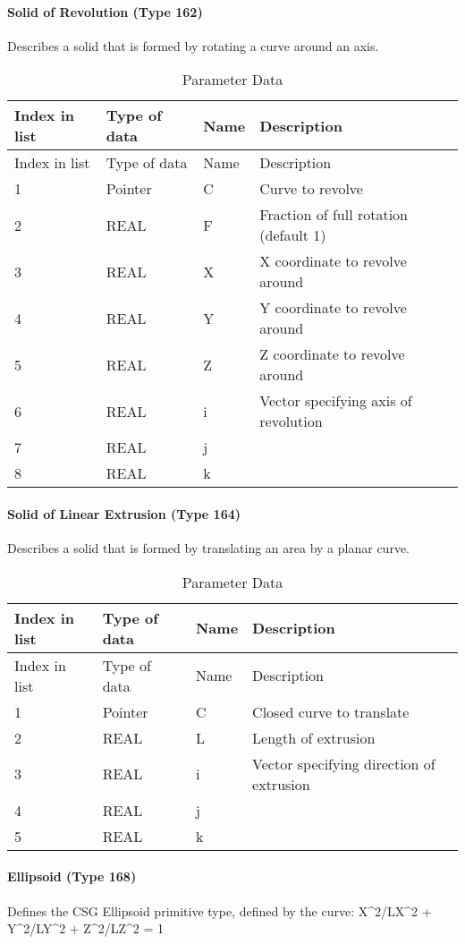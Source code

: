 \paragraph{Solid of Revolution (Type
162)}\label{solid-of-revolution-type-162}

Describes a solid that is formed by rotating a curve around an axis.

\begin{longtable}[c]{@{}llll@{}}
\caption{Parameter Data}\tabularnewline
\toprule
Index in list & Type of data & Name & Description\tabularnewline
\midrule
\endfirsthead
\toprule
Index in list & Type of data & Name & Description\tabularnewline
\midrule
\endhead
1 & Pointer & C & Curve to revolve\tabularnewline
2 & REAL & F & Fraction of full rotation (default 1)\tabularnewline
3 & REAL & X & X coordinate to revolve around\tabularnewline
4 & REAL & Y & Y coordinate to revolve around\tabularnewline
5 & REAL & Z & Z coordinate to revolve around\tabularnewline
6 & REAL & i & Vector specifying axis of revolution\tabularnewline
7 & REAL & j &\tabularnewline
8 & REAL & k &\tabularnewline
\bottomrule
\end{longtable}

\paragraph{Solid of Linear Extrusion (Type
164)}\label{solid-of-linear-extrusion-type-164}

Describes a solid that is formed by translating an area by a planar
curve.

\begin{longtable}[c]{@{}llll@{}}
\caption{Parameter Data}\tabularnewline
\toprule
Index in list & Type of data & Name & Description\tabularnewline
\midrule
\endfirsthead
\toprule
Index in list & Type of data & Name & Description\tabularnewline
\midrule
\endhead
1 & Pointer & C & Closed curve to translate\tabularnewline
2 & REAL & L & Length of extrusion\tabularnewline
3 & REAL & i & Vector specifying direction of extrusion\tabularnewline
4 & REAL & j &\tabularnewline
5 & REAL & k &\tabularnewline
\bottomrule
\end{longtable}

\paragraph{Ellipsoid (Type 168)}\label{ellipsoid-type-168}

Defines the CSG Ellipsoid primitive type, defined by the curve:
X\^{}2/LX\^{}2 + Y\^{}2/LY\^{}2 + Z\^{}2/LZ\^{}2 = 1

